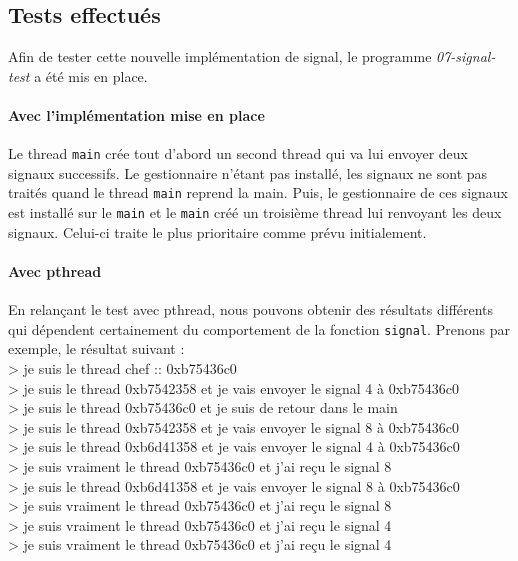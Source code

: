 \subsection{Tests effectués}
Afin de tester cette nouvelle implémentation de signal, le programme \emph{07-signal-test} a été mis en place. 
\paragraph{Avec l'implémentation mise en place}
Le thread \texttt{main} crée tout d'abord un second thread qui va lui envoyer deux signaux successifs. Le gestionnaire n'étant pas installé, les signaux ne sont pas traités quand le thread \texttt{main} reprend la main. Puis, le gestionnaire de ces signaux est installé sur le \texttt{main} et le \texttt{main} créé un troisième thread lui renvoyant les deux signaux. Celui-ci traite le plus prioritaire comme prévu initialement. 

\paragraph{Avec pthread}
En relançant le test avec pthread, nous pouvons obtenir des résultats différents qui dépendent certainement du comportement de la fonction \texttt{signal}. Prenons par exemple, le résultat suivant :\\
> je suis le thread chef :: 0xb75436c0 \\
> je suis le thread 0xb7542358 et je vais envoyer le signal 4 à 0xb75436c0 \\
> je suis le thread 0xb75436c0 et je suis de retour dans le main \\
> je suis le thread 0xb7542358 et je vais envoyer le signal 8 à 0xb75436c0\\
> je suis le thread 0xb6d41358 et je vais envoyer le signal 4 à 0xb75436c0\\
> je suis vraiment le thread 0xb75436c0 et j'ai reçu le signal 8\\
> je suis le thread 0xb6d41358 et je vais envoyer le signal 8 à 0xb75436c0\\
> je suis vraiment le thread 0xb75436c0 et j'ai reçu le signal 8\\
> je suis vraiment le thread 0xb75436c0 et j'ai reçu le signal 4\\
> je suis vraiment le thread 0xb75436c0 et j'ai reçu le signal 4\\

